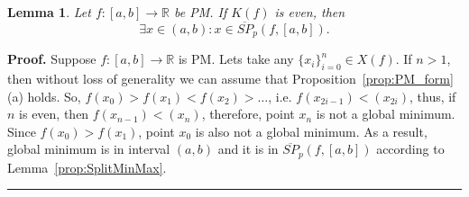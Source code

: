 \documentclass[12pt, a4paper]{article}
\newtheorem{lemma}[theorem]{Lemma}
\newenvironment{proof}[1][Proof]{\noindent \textbf{#1.} }{\  \rule{0.5em}{0.5em}}
\numberwithin{equation}{section}
\begin{document}
\begin{lemma}\label{lm:evenkappa}
  Let $f:[a,b] \rightarrow \mathbb{R}$ be PM.
  If $K(f)$ is even, then
  \begin{equation}
    \exists x \in (a, b): x \in  \overline{SP}_p(f, [a, b]). 
  \end{equation}       
\end{lemma}
\begin{proof}
  Suppose $f:[a, b] \rightarrow \mathbb{R}$ is PM.
  Lets take any $\{x_i\}_{i=0}^n \in X(f)$.
  If $n>1$, then without loss of generality
  we can assume that Proposition~\ref{prop:PM_form}(a) 
  holds. So, $f(x_0)>f(x_1)<f(x_2)>\dots$, i.e.
  $f(x_{2i-1})<(x_{2i})$, thus,
  if $n$ is even, then $f(x_{n-1})<(x_{n})$,
  therefore, point $x_{n}$ is not a global minimum.
  Since $f(x_0)>f(x_1)$, point $x_0$ is also
  not a global minimum. As a result,
  global minimum is in interval $(a, b)$ 
  and it is in $\overline{SP}_p(f, [a, b])$ according to
  Lemma~\ref{prop:SplitMinMax}. 
\end{proof}
\end{document}
